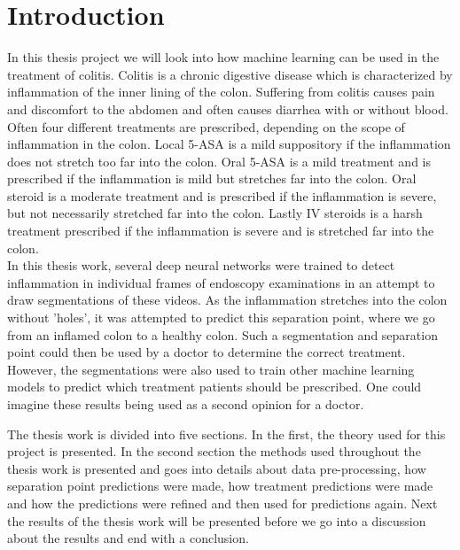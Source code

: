 \section{Introduction}
In this thesis project we will look into how machine learning can be used in the treatment of colitis. Colitis is a chronic digestive disease which is characterized by inflammation of the inner lining of the colon. Suffering from colitis causes pain and discomfort to the abdomen and often causes diarrhea with or without blood\cite{colitis}. Often four different treatments are prescribed, depending on the scope of inflammation in the colon. Local 5-ASA is a mild suppository if the inflammation does not stretch too far into the colon. Oral 5-ASA is a mild treatment and is prescribed if the inflammation is mild but stretches far into the colon. Oral steroid is a moderate treatment and is prescribed if the inflammation is severe, but not necessarily stretched far into the colon. Lastly IV steroids is a harsh treatment prescribed if the inflammation is severe and is stretched far into the colon.\\
In this thesis work, several deep neural networks were trained to detect inflammation in individual frames of endoscopy examinations in an attempt to draw segmentations of these videos. As the inflammation stretches into the colon without 'holes', it was attempted to predict this separation point, where we go from an inflamed colon to a healthy colon. Such a segmentation and separation point could then be used by a doctor to determine the correct treatment. However, the segmentations were also used to train other machine learning models to predict which treatment patients should be prescribed. One could imagine these results being used as a second opinion for a doctor.

The thesis work is divided into five sections. In the first, the theory used for this project is presented. In the second section the methods used throughout the thesis work is presented and goes into details about data pre-processing, how separation point predictions were made,  how treatment predictions were made and how the predictions were refined and then used for predictions again. Next the results of the thesis work will be presented before we go into a discussion about the results and end with a conclusion.